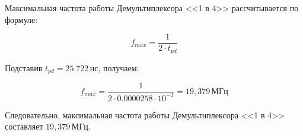 Максимальная частота работы Демультиплексора <<1 в 4>> рассчитывается по формуле:

\[
	f_{max} = \frac{1}{2 \cdot t_{pd}}
\]

Подставив \( t_{pd} = 25.722 \, \text{нс} \), получаем:

\[
	f_{max} = \frac{1}{2 \cdot 0.0000258 \cdot 10^{-3}} = 19,379 \, \text{МГц}
\]

Следовательно, максимальная частота работы Демультиплексора <<1 в 4>> составляет \( 19,379 \, \text{МГц} \).
